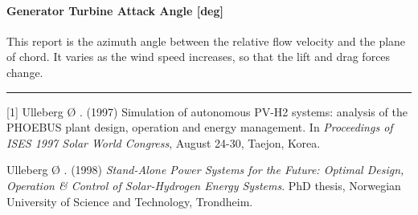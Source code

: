 \paragraph{Generator Turbine Attack Angle {[}deg{]}}\label{generator-turbine-attack-angle-deg}

This report is the azimuth angle between the relative flow velocity and the plane of chord. It varies as the wind speed increases, so that the lift and drag forces change.

\begin{center}\rule{0.5\linewidth}{0.4pt}\end{center}

{[}1{]} Ulleberg Ø . (1997) Simulation of autonomous PV-H2 systems: analysis of the PHOEBUS plant design, operation and energy management. In \emph{Proceedings of ISES 1997 Solar World Congress}, August 24-30, Taejon, Korea.

Ulleberg Ø . (1998) \emph{Stand-Alone Power Systems for the Future: Optimal Design, Operation \& Control of Solar-Hydrogen Energy Systems}. PhD thesis, Norwegian University of Science and Technology, Trondheim.
